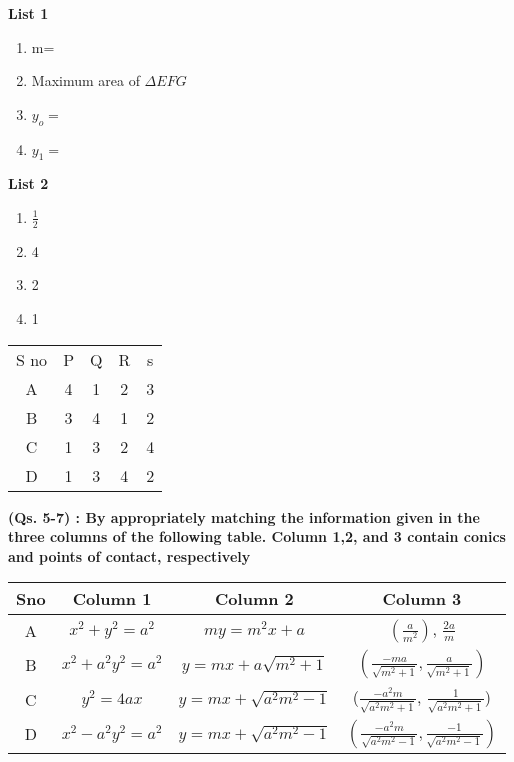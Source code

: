 \begin{enumerate}
\begin{minipage}[t]{0.45\textwidth}
\textbf{List 1}
\begin{enumerate}
    \item m=
    \item Maximum area of $\Delta EFG$
    \item $y_o=$
    \item $y_1=$
\end{enumerate}
\end{minipage}%
\hfill
\begin{minipage}[t]{0.45\textwidth}
\textbf{List 2}
\begin{enumerate}
    \item $\frac{1}{2}$
    \item 4
    \item 2
    \item 1
\end{enumerate}
\end{minipage} 


\begin{table}[h!]
\centering
\begin{tabular}{|c|c|c|c|c|}
\hline
S no & P & Q & R & s \\
A &4 & 1 & 2 & 3 \\
B & 3 & 4 & 1 & 2 \\
C & 1 & 3& 2 & 4 \\
D & 1 & 3 & 4 & 2 \\
\hline
\end{tabular}

\end{table}

\textbf{(Qs. 5-7) : By appropriately matching the information given in the three columns of the following table. Column 1,2, and 3 contain conics and points of contact, respectively}

\begin{table}[h!]
\centering
\begin{tabular}{|c|c|c|c|}
\hline
Sno & Column 1       & Column 2 & Column 3 \\
\hline
A & $x^2 + y^2 = a^2$ & $my = m^2x + a$ & $(\frac{a}{m^2})$, $\frac{2a}{m}$ \\
B & $x^2 + a^2y^2 = a^2  $      & $y = mx +a\sqrt{m^2 + 1}$  & $(\frac{-ma}{\sqrt{m^2 + 1}},\frac{a}{\sqrt{m^2 + 1}})   $   \\
C & $y^2=4ax $  & $y = mx + \sqrt{a^2m^2 - 1}$ & ($\frac{-a^2m}{\sqrt{a^2m^2 + 1}}$, $\frac{1}{\sqrt{a^2m^2 + 1}}$)    \\
D & $x^2 - a^2y^2 = a^2$     & $y = mx + \sqrt{a^2m^2 - 1 }$  & $(\frac{-a^2m}{\sqrt{a^2m^2 - 1}}, \frac{-1}{\sqrt{a^2m^2 - 1}})$      \\


\end{tabular}
\end{table}
\end{enumerate}
